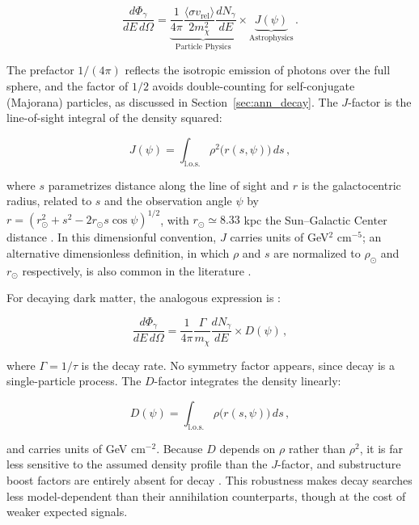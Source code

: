 \begin{equation}
	\frac{d\Phi_\gamma}{dE\, d\Omega} = \underbrace{\frac{1}{4\pi} \frac{\langle \sigma v_\text{rel} \rangle}{2 m_\chi^2} \frac{dN_\gamma}{dE}}_{\text{Particle Physics}} \times \underbrace{J(\psi)}_{\text{Astrophysics}} \,.
	\label{eq:flux_ann}
\end{equation}

The prefactor $1/(4\pi)$ reflects the isotropic emission of photons over the full sphere, and the factor of $1/2$ avoids double-counting for self-conjugate (Majorana) particles, as discussed in Section~\ref{sec:ann_decay}.
The $J$-factor is the line-of-sight integral of the density squared:

\begin{equation}
	J(\psi) = \int_\text{l.o.s.} \rho^2\bigl(r(s, \psi)\bigr) \, ds \,,
	\label{eq:jfactor}
\end{equation}

where $s$ parametrizes distance along the line of sight and $r$ is the galactocentric radius, related to $s$ and the observation angle $\psi$ by $r = (r_\odot^2 + s^2 - 2 r_\odot s \cos\psi)^{1/2}$, with $r_\odot \simeq 8.33$ kpc the Sun--Galactic Center distance \cite{Cirelli:2024ssz}.
In this dimensionful convention, $J$ carries units of GeV$^2$ cm$^{-5}$; an alternative dimensionless definition, in which $\rho$ and $s$ are normalized to $\rho_\odot$ and $r_\odot$ respectively, is also common in the literature \cite{Cirelli:2024ssz}.

For decaying dark matter, the analogous expression is \cite{Cirelli:2024ssz,Pinetti:2021jjs}:

\begin{equation}
	\frac{d\Phi_\gamma}{dE\, d\Omega} = \frac{1}{4\pi} \frac{\Gamma}{m_\chi} \frac{dN_\gamma}{dE} \times D(\psi) \,,
	\label{eq:flux_dec}
\end{equation}

where $\Gamma = 1/\tau$ is the decay rate.
No symmetry factor appears, since decay is a single-particle process.
The $D$-factor integrates the density linearly:

\begin{equation}
	D(\psi) = \int_\text{l.o.s.} \rho\bigl(r(s, \psi)\bigr) \, ds \,,
	\label{eq:dfactor}
\end{equation}

and carries units of GeV cm$^{-2}$.
Because $D$ depends on $\rho$ rather than $\rho^2$, it is far less sensitive to the assumed density profile than the $J$-factor, and substructure boost factors are entirely absent for decay \cite{Cirelli:2024ssz}.
This robustness makes decay searches less model-dependent than their annihilation counterparts, though at the cost of weaker expected signals.

